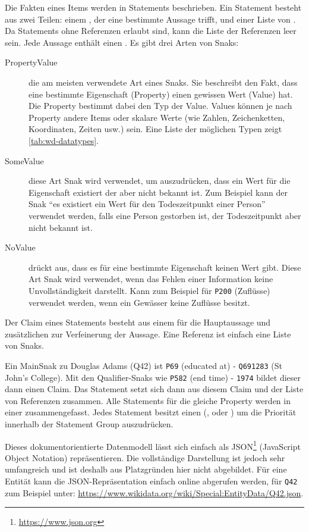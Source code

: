 Die Fakten eines Items werden in Statements beschrieben.
Ein Statement besteht aus zwei Teilen: einem , der eine bestimmte Aussage trifft, und einer Liste von .
Da Statements ohne Referenzen erlaubt sind, kann die Liste der Referenzen leer sein.
Jede Aussage enthält einen .
Es gibt drei Arten von Snaks:
\begin{description}
\item[PropertyValue] die am meisten verwendete Art eines Snaks. Sie beschreibt den Fakt, dass eine bestimmte Eigenschaft (Property) einen gewissen Wert (Value) hat. Die Property bestimmt dabei den Typ der Value. Values können je nach Property andere Items oder skalare Werte (wie Zahlen, Zeichenketten, Koordinaten, Zeiten usw.) sein. Eine Liste der möglichen Typen zeigt \cref{tab:wd-datatypes}.
\item[SomeValue] diese Art Snak wird verwendet, um auszudrücken, dass ein Wert für die Eigenschaft existiert der aber nicht bekannt ist. Zum Beispiel kann der Snak "`es existiert ein Wert für den Todeszeitpunkt einer Person"' verwendet werden, falls eine Person gestorben ist, der Todeszeitpunkt aber nicht bekannt ist.
\item[NoValue] drückt aus, dass es für eine bestimmte Eigenschaft keinen Wert gibt. Diese Art Snak wird verwendet, wenn das Fehlen einer Information keine Unvollständigkeit darstellt. Kann zum Beispiel für \verb|P200| (Zuflüsse) verwendet werden, wenn ein Gewässer keine Zuflüsse besitzt. 
\end{description}
Der Claim eines Statements besteht aus einem  für die Hauptaussage und zusätzlichen  zur Verfeinerung der Aussage.
Eine Referenz ist einfach eine Liste von Snaks. 

Ein MainSnak zu Douglas Adams (Q42) ist \verb|P69| (educated at) - \verb|Q691283| (St John's College).
Mit den Qualifier-Snaks wie \verb|P582| (end time) - \verb|1974| bildet dieser dann einen Claim.
Das Statement setzt sich dann aus diesem Claim und der Liste von Referenzen zusammen.
Alle Statements für die gleiche Property werden in einer  zusammengefasst.
Jedes Statement besitzt einen  (,  oder ) um die Priorität innerhalb der Statement Group auszudrücken.

Dieses dokumentorientierte Datenmodell lässt sich einfach als JSON\footnote{\url{https://www.json.org}} (JavaScript Object Notation) repräsentieren.
Die vollständige Darstellung ist jedoch sehr umfangreich und ist deshalb aus Platzgründen hier nicht abgebildet.
Für eine Entität kann die JSON-Repräsentation einfach online abgerufen werden, für \verb|Q42| zum Beispiel unter: \url{https://www.wikidata.org/wiki/Special:EntityData/Q42.json}.

